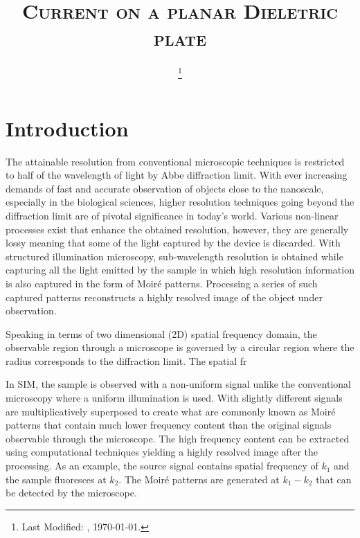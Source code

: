 \documentclass[11pt]{article}
\renewcommand{\^}{\hat}  %
\begin{document}
\title{\textsc{Current on a planar Dieletric plate}\\}
\date{\footnote{Last Modified: \currenttime, \today.}}
\maketitle

\section*{Introduction}

The attainable resolution from conventional microscopic techniques is restricted to half of the wavelength of light by Abbe diffraction limit. With ever increasing demands of fast and accurate observation of objects close to the nanoscale, especially in the biological sciences, higher resolution techniques going beyond the diffraction limit are of pivotal significance in today's world. Various non-linear processes exist that enhance the obtained resolution, however, they are generally lossy meaning that some of the light captured by the device is discarded. With structured illumination microscopy, sub-wavelength resolution is obtained while capturing all the light emitted by the sample in which high resolution information is also captured in the form of Moir\'e patterns. Processing a series of such captured patterns reconstructs a highly resolved image of the object under observation.

Speaking in terms of two dimensional (2D) spatial frequency domain, the observable region through a microscope is governed by a circular region where the radius corresponds to the diffraction limit. The spatial fr

In SIM, the sample is observed with a non-uniform signal unlike the conventional microscopy where a uniform illumination is used. With slightly different signals are multiplicatively superposed to create what are commonly known as Moir\'e patterns that contain much lower frequency content than the original signals observable through the microscope. The high frequency content can be extracted using computational techniques yielding a highly resolved image after the processing. As an example, the source signal contains spatial frequency of $k_1$ and the sample fluoresces at $k_2$. The Moir\'e patterns are generated at $k_1 - k_2$ that can be detected by the microscope.
\end{document}
